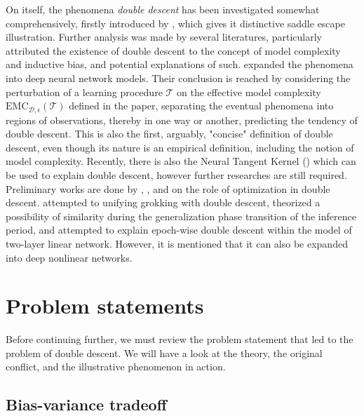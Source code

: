 On itself, the phenomena \textit{double descent} has been investigated somewhat comprehensively, firstly introduced by \cite{belkin_reconciling_2019}, which gives it distinctive saddle escape illustration. Further analysis was made by several literatures, particularly attributed the existence of double descent to the concept of model complexity and inductive bias, and potential explanations of such. \cite{nakkiran_deep_2019} expanded the phenomena into deep neural network models. Their conclusion is reached by considering the perturbation of a learning procedure $\mathcal{T}$ on the effective model complexity $\mathrm{EMC}_{\mathcal{D},\epsilon}(\mathcal{T})$ defined in the paper, separating the eventual phenomena into regions of observations, thereby in one way or another, predicting the tendency of double descent. This is also the first, arguably, "concise" definition of double descent, even though its nature is an empirical definition, including the notion of model complexity. Recently, there is also the Neural Tangent Kernel (\cite{Jacot:2018:NTK}) which can be used to explain double descent, however further researches are still required. Preliminary works are done by \cite{lafon_understanding_2024}, \cite{schaeffer_double_2023}, and \cite{liu2023understandingroleoptimizationdouble} on the role of optimization in double descent. \cite{davies_unifying_2023} attempted to unifying grokking with double descent, theorized a possibility of similarity during the generalization phase transition of the inference period, and \cite{olmin2024understandingepochwisedoubledescent} attempted to explain epoch-wise double descent within the model of two-layer linear network. However, it is mentioned that it can also be expanded into deep nonlinear networks. 

\section{Problem statements}

Before continuing further, we must review the problem statement that led to the problem of double descent. We will have a look at the theory, the original conflict, and the illustrative phenomenon in action. 

\subsection{Bias-variance tradeoff}

